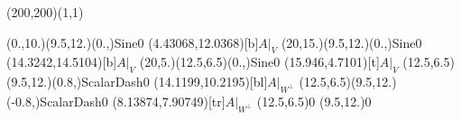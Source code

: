 \unitlength=1bp%

\begin{feynartspicture}(200,200)(1,1)

\FADiagram{}
\FAProp(0.,10.)(9.5,12.)(0.,){Sine}{0}
\FALabel(4.43068,12.0368)[b]{$A|_V$}
\FAProp(20,15.)(9.5,12.)(0.,){Sine}{0}
\FALabel(14.3242,14.5104)[b]{$A|_V$}
\FAProp(20,5.)(12.5,6.5)(0.,){Sine}{0}
\FALabel(15.946,4.7101)[t]{$A|_V$}
\FAProp(12.5,6.5)(9.5,12.)(0.8,){ScalarDash}{0}
\FALabel(14.1199,10.2195)[bl]{$A|_{W^\perp}$}
\FAProp(12.5,6.5)(9.5,12.)(-0.8,){ScalarDash}{0}
\FALabel(8.13874,7.90749)[tr]{$A|_{W^\perp}$}
\FAVert(12.5,6.5){0}
\FAVert(9.5,12.){0}
\end{feynartspicture}

